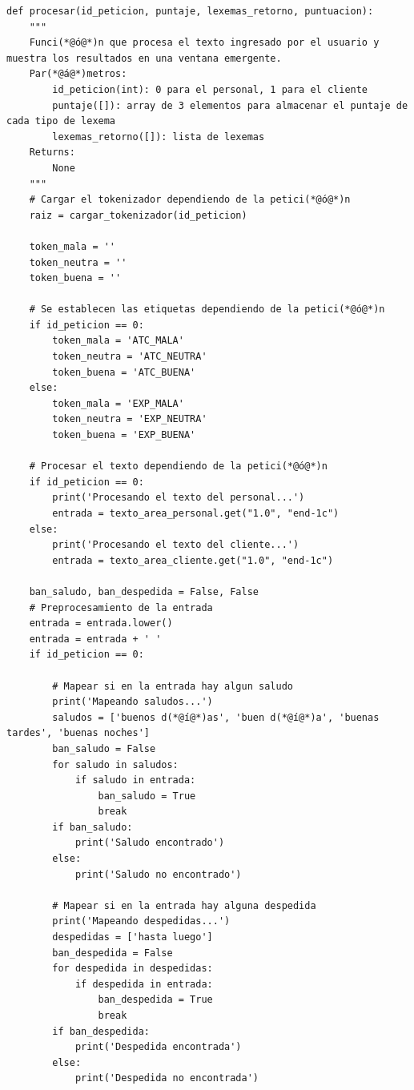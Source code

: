 \documentclass[10pt,times,twocolumn]{article}
\begin{document}
\begin{lstlisting}[caption={Core del análisis. Procesar}, xleftmargin=0.05\textwidth]
def procesar(id_peticion, puntaje, lexemas_retorno, puntuacion):
    """
    Funci(*@ó@*)n que procesa el texto ingresado por el usuario y muestra los resultados en una ventana emergente.
    Par(*@á@*)metros:
        id_peticion(int): 0 para el personal, 1 para el cliente
        puntaje([]): array de 3 elementos para almacenar el puntaje de cada tipo de lexema
        lexemas_retorno([]): lista de lexemas
    Returns:
        None
    """
    # Cargar el tokenizador dependiendo de la petici(*@ó@*)n
    raiz = cargar_tokenizador(id_peticion)

    token_mala = ''
    token_neutra = ''
    token_buena = ''

	# Se establecen las etiquetas dependiendo de la petici(*@ó@*)n
    if id_peticion == 0:
        token_mala = 'ATC_MALA'
        token_neutra = 'ATC_NEUTRA'
        token_buena = 'ATC_BUENA'
    else:
        token_mala = 'EXP_MALA'
        token_neutra = 'EXP_NEUTRA'
        token_buena = 'EXP_BUENA'

    # Procesar el texto dependiendo de la petici(*@ó@*)n
    if id_peticion == 0:
        print('Procesando el texto del personal...')
        entrada = texto_area_personal.get("1.0", "end-1c")
    else:
        print('Procesando el texto del cliente...')
        entrada = texto_area_cliente.get("1.0", "end-1c")
    
    ban_saludo, ban_despedida = False, False
    # Preprocesamiento de la entrada
    entrada = entrada.lower()
    entrada = entrada + ' '
    if id_peticion == 0:

        # Mapear si en la entrada hay algun saludo
        print('Mapeando saludos...')
        saludos = ['buenos d(*@í@*)as', 'buen d(*@í@*)a', 'buenas tardes', 'buenas noches']
        ban_saludo = False
        for saludo in saludos:
            if saludo in entrada:
                ban_saludo = True
                break
        if ban_saludo:
            print('Saludo encontrado')
        else:
            print('Saludo no encontrado')

        # Mapear si en la entrada hay alguna despedida
        print('Mapeando despedidas...')
        despedidas = ['hasta luego']
        ban_despedida = False
        for despedida in despedidas:
            if despedida in entrada:
                ban_despedida = True
                break
        if ban_despedida:
            print('Despedida encontrada')
        else:
            print('Despedida no encontrada')
        

\end{lstlisting}
\end{document}
